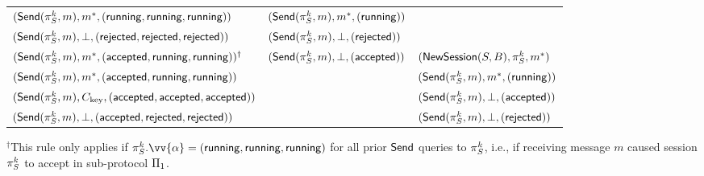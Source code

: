 \begin{landscape}
\begin{table}
\begin{threeparttable}
\begin{tabular}{  l  l  l }
		\rowcolor{ProtocolOneColor}
		$(\Q{Send}(\oracle[S][k],m), m^*, (\running,\running,\running))$ &$(\Q{Send}(\oracle[S][k],m), m^*, (\running))$& \NULL  \\
		\rowcolor{ProtocolOneColor}
		$(\Q{Send}(\oracle[S][k],m), \bot, (\rejected,\rejected,\rejected))$ & $(\Q{Send}(\oracle[S][k],m), \bot, (\rejected))$ & \NULL  \\
		\rowcolor{ProtocolOneColor}
		$(\Q{Send}(\oracle[S][k],m), m^*, (\accepted,\running,\running))^\dagger$ &$(\Q{Send}(\oracle[S][k],m), \bot, (\accepted))$& $(\Q{NewSession}(S, B ),\oracle[S][k], m^* )$ \\
		\rowcolor{ProtocolTwoColor}
		$(\Q{Send}(\oracle[S][k],m), m^*, (\accepted,\running,\running))$ & \NULL & $(\Q{Send}(\oracle[S][k], m), m^*, (\running))$\\
		\rowcolor{ProtocolTwoColor}
		$(\Q{Send}(\oracle[S][k],m), \Ckey, (\accepted,\accepted,\accepted))$ & \NULL &$(\Q{Send}(\oracle[S][k], m), \bot, (\accepted))$\\
		\rowcolor{ProtocolTwoColor}		
		$(\Q{Send}(\oracle[S][k],m), \bot, (\accepted,\rejected,\rejected))$ & \NULL & $(\Q{Send}(\oracle[S][k],m), \bot, (\rejected))$  \\
		
		\bottomrule
	
	\end{tabular}
	
		\begin{tablenotes}
     \footnotesize
     \smallskip
     \item $^\dagger$This rule only applies if $\oracle[S][k].\vv{\runstate} = (\running,\running,\running)$ for all prior $\mathsf{Send}$ queries to $\oracle[S][k]$,
     i.e., if receiving message $m$ caused session $\oracle[S][k]$ to accept in sub-protocol $\mathrm{\Pi}_1$.
   \end{tablenotes}

\end{threeparttable}



\end{table}

\end{landscape}

\restoregeometry



